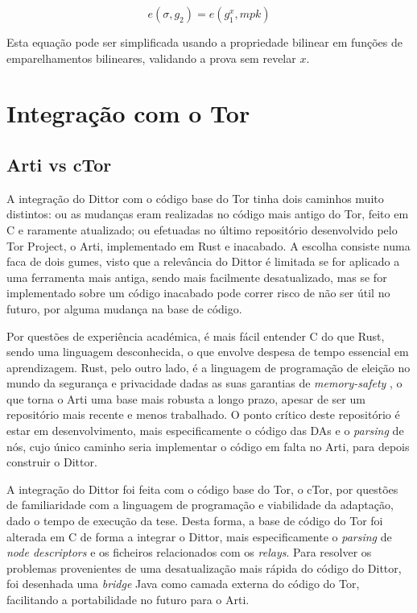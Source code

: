 \begin{equation*}
    e(\sigma, g_2) = e(g_1^x, mpk)
\end{equation*}

Esta equação pode ser simplificada usando a propriedade bilinear em funções de emparelhamentos bilineares, validando a prova sem revelar $x$.

\section{Integração com o Tor}
\label{sec:dittor_integracao_tor}

\subsection{Arti vs cTor}
\label{sub:dittor_arti_vs_ctor}

A integração do Dittor com o código base do Tor tinha dois caminhos muito distintos: ou as mudanças eram realizadas no código mais antigo do Tor, feito em C e raramente atualizado; ou efetuadas no último repositório desenvolvido pelo Tor Project, o Arti, implementado em Rust e inacabado. A escolha consiste numa faca de dois gumes, visto que a relevância do Dittor é limitada se for aplicado a uma ferramenta mais antiga, sendo mais facilmente desatualizado, mas se for implementado sobre um código inacabado pode correr risco de não ser útil no futuro, por alguma mudança na base de código.

Por questões de experiência académica, é mais fácil entender C do que Rust, sendo uma linguagem desconhecida, o que envolve despesa de tempo essencial em aprendizagem. Rust, pelo outro lado, é a linguagem de programação de eleição no mundo da segurança e privacidade dadas as suas garantias de \textit{memory-safety} \cite{xu2021memorysafety}, o que torna o Arti uma base mais robusta a longo prazo, apesar de ser um repositório mais recente e menos trabalhado. O ponto crítico deste repositório é estar em desenvolvimento, mais especificamente o código das DAs e o \textit{parsing} de nós, cujo único caminho seria implementar o código em falta no Arti, para depois construir o Dittor.

A integração do Dittor foi feita com o código base do Tor, o cTor, por questões de familiaridade com a linguagem de programação e viabilidade da adaptação, dado o tempo de execução da tese. Desta forma, a base de código do Tor foi alterada em C de forma a integrar o Dittor, mais especificamente o \textit{parsing} de \textit{node descriptors} e os ficheiros relacionados com os \textit{relays}. Para resolver os problemas provenientes de uma desatualização mais rápida do código do Dittor, foi desenhada uma \textit{bridge} Java como camada externa do código do Tor, facilitando a portabilidade no futuro para o Arti.

